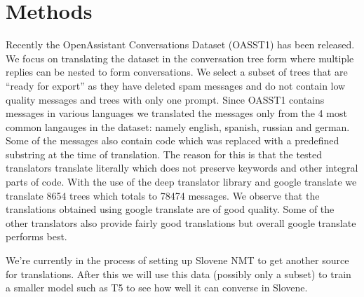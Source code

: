\documentclass[fleqn,moreauthors,10pt]{ds_report}
\begin{document}
\section*{Methods}
    Recently the OpenAssistant Conversations Dataset (OASST1) has been released.
    We focus on translating the dataset in the conversation tree form where multiple replies can be nested to form conversations.
    We select a subset of trees that are ``ready for export'' as they have deleted spam messages and do not contain low quality messages and trees with only one prompt.
    Since OASST1 contains messages in various languages we translated the messages only from the 4 most common langauges in the dataset: namely english, spanish, russian and german.
    Some of the messages also contain code which was replaced with a predefined substring at the time of translation.
    The reason for this is that the tested translators translate literally which does not preserve keywords and other integral parts of code.
    With the use of the deep translator library and google translate we translate 8654 trees which totals to 78474 messages.
    We observe that the translations obtained using google translate are of good quality.
    Some of the other translators also provide fairly good translations but overall google translate performs best.

    We're currently in the process of setting up Slovene NMT to get another source for translations.
    After this we will use this data (possibly only a subset) to train a smaller model such as T5 to see how well it can converse in Slovene.
    
    




\end{document}
